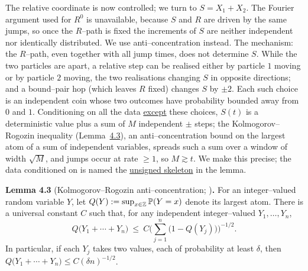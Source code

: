 \documentclass[11pt]{article}
\theoremstyle{plain}
\theoremstyle{definition}
\theoremstyle{remark}
\newcommand{\Z}{\mathbb{Z}}\newcommand{\R}{\mathbb{R}}\newcommand{\N}{\mathbb{N}}
\begin{document}
The relative coordinate is now controlled; we turn to $S=X_1+X_2$. The Fourier argument
used for $R^0$ is unavailable, because $S$ and $R$ are driven by the same jumps, so once
the $R$--path is fixed the increments of $S$ are neither independent nor identically
distributed. We use anti--concentration instead. The mechanism: the $R$--path, even
together with all jump times, does not determine $S$. While the two particles are apart,
a relative step can be realised either by particle $1$ moving or by particle $2$ moving,
the two realisations changing $S$ in opposite directions; and a bound--pair hop (which
leaves $R$ fixed) changes $S$ by $\pm2$. Each such choice is an independent coin whose
two outcomes have probability bounded away from $0$ and $1$. Conditioning on all the data
\underline{except} these choices, $S(t)$ is a deterministic value plus a sum of $M$
independent $\pm$ steps; the Kolmogorov--Rogozin inequality (Lemma~\hyperref[lem_KR]{4.3}), an
anti--concentration bound on the largest atom of a sum of independent variables, spreads
such a sum over a window of width $\sqrt M$, and jumps occur at rate $\ge1$, so
$M\gtrsim t$. We make this precise; the data conditioned on is named the \underline{unsigned
skeleton} in the lemma.

\label{lem_KR}\noindent\textbf{Lemma 4.3} (Kolmogorov--Rogozin anti--concentration; {\cite[Ch.~III]{Petrov}})\textbf{.} 
For an integer--valued random variable $Y$, let $Q(Y):=\sup_{x\in\Z}\PP(Y=x)$ denote
its largest atom. There is a universal constant $C$ such that, for any independent
integer--valued $Y_1,\dots,Y_n$,
\[
  Q\big(Y_1+\cdots+Y_n\big)\ \le\
  C\Big(\textstyle\sum_{j=1}^n\big(1-Q(Y_j)\big)\Big)^{-1/2}.
\]
In particular, if each $Y_j$ takes two values, each of probability at least $\delta$,
then $Q\big(Y_1+\cdots+Y_n\big)\le C(\delta n)^{-1/2}$.
\par
\end{document}
